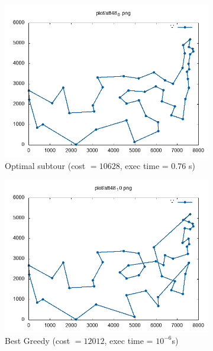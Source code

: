 \begin{figure}[h]
	\begin{subfigure}{.5\textwidth}
		\centering
		\includegraphics[width=\columnwidth]{../res/att48_0.png}
		\caption{Optimal subtour (cost $ = 10628 $, exec time = $ 0.76 $ s)}
		\label{fig:att48_best}
	\end{subfigure}
	\begin{subfigure}{.5\textwidth}
		\centering
		\includegraphics[width=\columnwidth]{../res/att48_10.png}
		\caption{Best Greedy (cost $ = 12012 $, exec time = $ 10^{-6} $s)}
		\label{fig:att48_GREEDY}
	\end{subfigure}
	\begin{subfigure}{.5\textwidth}
	\centering

\end{subfigure}
\end{figure}
